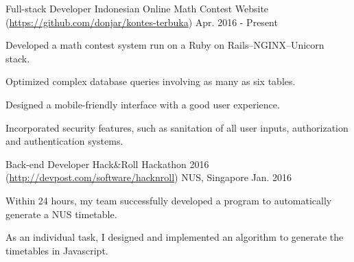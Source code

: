 

\begin{cventries}

	\cventry
	{Full-stack Developer} %
	{Indonesian Online Math Contest Website (\url{https://github.com/donjar/kontes-terbuka})} %
	{} %
	{Apr. 2016 - Present} %
	{
		\begin{cvitems} %
		\item {Developed a math contest system run on a Ruby on Rails--NGINX--Unicorn stack.}
		\item {Optimized complex database queries involving as many as six tables.}
		\item {Designed a mobile-friendly interface with a good user experience.}
		\item {Incorporated security features, such as sanitation of all user inputs, authorization and authentication systems.}
		\end{cvitems}
	}

	\cventry
	{Back-end Developer} %
	{Hack\&Roll Hackathon 2016 (\url{http://devpost.com/software/hacknroll})} %
	{NUS, Singapore} %
	{Jan. 2016} %
	{
		\begin{cvitems} %
		\item {Within 24 hours, my team successfully developed a program to automatically generate a NUS timetable.}
		\item {As an individual task, I designed and implemented an algorithm to generate the timetables in Javascript.}
		\end{cvitems}
	}


\end{cventries}
